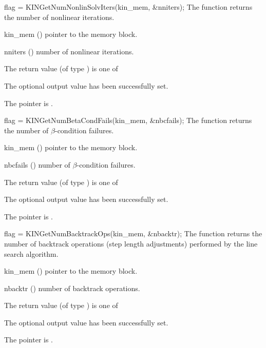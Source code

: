 {}
{
  flag = KINGetNumNonlinSolvIters(kin\_mem, \&nniters);
}
{
  The function  returns the number
  of nonlinear iterations.
}
{
  \begin{args}
  \item[kin\_mem] ()
    pointer to the {\kinsol} memory block.
  \item[nniters] ()
    number of nonlinear iterations.
  \end{args}
}
{
  The return value  (of type ) is one of
  \begin{args}
  \item[\Id{KIN\_SUCCESS}] 
    The optional output value has been successfully set.
  \item[\Id{KIN\_MEM\_NULL}]
    The  pointer is .
  \end{args}
}
{}
{
  flag = KINGetNumBetaCondFails(kin\_mem, \&nbcfails);
}
{
  The function  returns the number
  of $\beta$-condition failures.
}
{
  \begin{args}[nbcfails]
  \item[kin\_mem] ()
    pointer to the {\kinsol} memory block.
  \item[nbcfails] ()
    number of $\beta$-condition failures.
  \end{args}
}
{
  The return value  (of type ) is one of
  \begin{args}
  \item[\Id{KIN\_SUCCESS}] 
    The optional output value has been successfully set.
  \item[\Id{KIN\_MEM\_NULL}]
    The  pointer is .
  \end{args}
}
{}
{
  flag = KINGetNumBacktrackOps(kin\_mem, \&nbacktr);
}
{
  The function  returns the number of
  backtrack operations (step length adjustments) performed by the
  line search algorithm.
}
{
  \begin{args}
  \item[kin\_mem] ()
    pointer to the {\kinsol} memory block.
  \item[nbacktr] ()
    number of backtrack operations.
  \end{args}
}
{
  The return value  (of type ) is one of
  \begin{args}
  \item[\Id{KIN\_SUCCESS}] 
    The optional output value has been successfully set.
  \item[\Id{KIN\_MEM\_NULL}]
    The  pointer is .
  \end{args}
}
